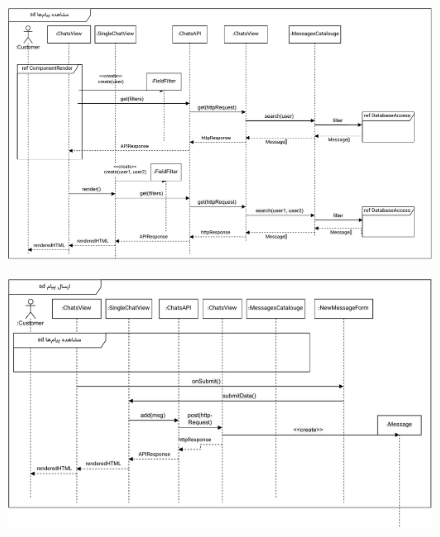 \begin{figure}[ht!]
	\centering
	\includegraphics[scale=0.8]{figs/design-sequence/3-47.pdf}
\end{figure}
\FloatBarrier
\newpage

\eject \pdfpagewidth=10in \pdfpageheight=9in
\begin{figure}[ht!]
	\centering
	\includegraphics[scale=0.8]{figs/design-sequence/3-48.pdf}
\end{figure}
\FloatBarrier
\newpage





\recalctypearea
\newpage
